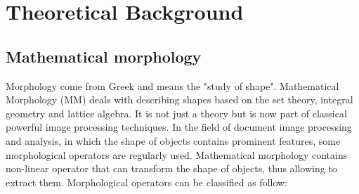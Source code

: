 
\graphicspath{ {3chapterTheory/image/} }
\chapter{Theoretical Background}
\section{Mathematical morphology}
Morphology come from Greek and means the "study of shape". Mathematical Morphology (MM) deals with describing shapes based on the set theory, integral geometry and lattice algebra. It is not just a theory but is now part of classical powerful image processing techniques. In the field of document image processing and analysis, in which the shape of objects contains prominent features, some morphological operators are regularly used. Mathematical morphology contains non-linear operator that can transform the shape of objects, thus allowing to extract them. Morphological operators can be classified as follow:
